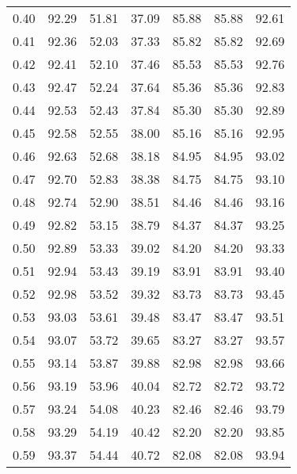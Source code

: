 \begin{tabular}{|c|c|c|c|c|c|c|}
      0.40 &     92.29 &     51.81 &      37.09 &   85.88 &      85.88 &         92.61 \\
      0.41 &     92.36 &     52.03 &      37.33 &   85.82 &      85.82 &         92.69 \\
      0.42 &     92.41 &     52.10 &      37.46 &   85.53 &      85.53 &         92.76 \\
      0.43 &     92.47 &     52.24 &      37.64 &   85.36 &      85.36 &         92.83 \\
      0.44 &     92.53 &     52.43 &      37.84 &   85.30 &      85.30 &         92.89 \\
      0.45 &     92.58 &     52.55 &      38.00 &   85.16 &      85.16 &         92.95 \\
      0.46 &     92.63 &     52.68 &      38.18 &   84.95 &      84.95 &         93.02 \\
      0.47 &     92.70 &     52.83 &      38.38 &   84.75 &      84.75 &         93.10 \\
      0.48 &     92.74 &     52.90 &      38.51 &   84.46 &      84.46 &         93.16 \\
      0.49 &     92.82 &     53.15 &      38.79 &   84.37 &      84.37 &         93.25 \\
      0.50 &     92.89 &     53.33 &      39.02 &   84.20 &      84.20 &         93.33 \\
      0.51 &     92.94 &     53.43 &      39.19 &   83.91 &      83.91 &         93.40 \\
      0.52 &     92.98 &     53.52 &      39.32 &   83.73 &      83.73 &         93.45 \\
      0.53 &     93.03 &     53.61 &      39.48 &   83.47 &      83.47 &         93.51 \\
      0.54 &     93.07 &     53.72 &      39.65 &   83.27 &      83.27 &         93.57 \\
      0.55 &     93.14 &     53.87 &      39.88 &   82.98 &      82.98 &         93.66 \\
      0.56 &     93.19 &     53.96 &      40.04 &   82.72 &      82.72 &         93.72 \\
      0.57 &     93.24 &     54.08 &      40.23 &   82.46 &      82.46 &         93.79 \\
      0.58 &     93.29 &     54.19 &      40.42 &   82.20 &      82.20 &         93.85 \\
      0.59 &     93.37 &     54.44 &      40.72 &   82.08 &      82.08 &         93.94 \\

\end{tabular}
